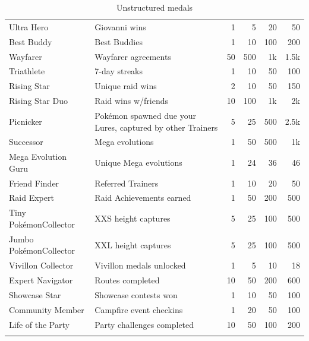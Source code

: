 \begin{longtable}{m{}m{}rrrr}
Ultra Hero & Giovanni wins & 1 & 5 & 20 & 50\\
Best Buddy & Best Buddies & 1 & 10 & 100 & 200\\
Wayfarer & Wayfarer agreements & 50 & 500 & 1k & 1.5k\\
Triathlete & 7-day streaks & 1 & 10 & 50 & 100\\
Rising Star & Unique raid wins & 2 & 10 & 50 & 150\\
Rising Star Duo & Raid wins w/friends & 10 & 100 & 1k & 2k\\
Picnicker & Pokémon spawned due your Lures, captured by other Trainers & 5 & 25 & 500 & 2.5k\\
Successor & Mega evolutions & 1 & 50 & 500 & 1k\\
Mega Evolution Guru & Unique Mega evolutions & 1 & 24 & 36 & 46\\
Friend Finder & Referred Trainers & 1 & 10 & 20 & 50\\
Raid Expert & Raid Achievements earned & 1 & 50 & 200 & 500\\
Tiny Pokémon\newline{}Collector & XXS height captures & 5 & 25 & 100 & 500\\
Jumbo Pokémon\newline{}Collector & XXL height captures & 5 & 25 & 100 & 500\\
Vivillon Collector & Vivillon medals unlocked & 1 & 5 & 10 & 18\\
Expert Navigator & Routes completed & 10 & 50 & 200 & 600\\
Showcase Star & Showcase contests won & 1 & 10 & 50 & 100\\
Community Member & Campfire event checkins & 1 & 20 & 50 & 100\\
Life of the Party & Party challenges completed & 10 & 50 & 100 & 200\\
  \caption{Unstructured medals\label{table:medals}}
\end{longtable}
\endgroup

